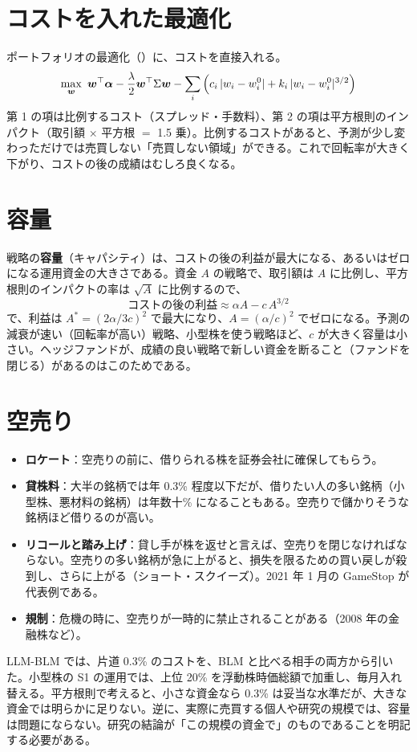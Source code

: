 \section{コストを入れた最適化}

ポートフォリオの最適化（）に、コストを直接入れる。
\begin{equation}
\max_{\bm w}\ \bm w^{\top}\bm\alpha - \frac{\lambda}{2}\bm w^{\top}\Sigma\bm w - \sum_i \Big( c_i\,|w_i - w_i^0| + k_i\,|w_i - w_i^0|^{3/2} \Big)
\end{equation}
第 1 の項は比例するコスト（スプレッド・手数料）、第 2 の項は平方根則のインパクト（取引額 $\times$ 平方根 $=$ 1.5 乗）。比例するコストがあると、予測が少し変わっただけでは売買しない「売買しない領域」ができる。これで回転率が大きく下がり、コストの後の成績はむしろ良くなる。

\section{容量}

戦略の\textbf{容量}（キャパシティ）は、コストの後の利益が最大になる、あるいはゼロになる運用資金の大きさである。資金 $A$ の戦略で、取引額は $A$ に比例し、平方根則のインパクトの率は $\sqrt{A}$ に比例するので、
\begin{equation}
\text{コストの後の利益} \approx \alpha A - c\,A^{3/2}
\end{equation}
で、利益は $A^* = (2\alpha / 3c)^2$ で最大になり、$A = (\alpha/c)^2$ でゼロになる。予測の減衰が速い（回転率が高い）戦略、小型株を使う戦略ほど、$c$ が大きく容量は小さい。ヘッジファンドが、成績の良い戦略で新しい資金を断ること（ファンドを閉じる）があるのはこのためである。

\section{空売り}

\begin{itemize}
\item \textbf{ロケート}：空売りの前に、借りられる株を証券会社に確保してもらう。
\item \textbf{貸株料}：大半の銘柄では年 0.3\% 程度以下だが、借りたい人の多い銘柄（小型株、悪材料の銘柄）は年数十\% になることもある。空売りで儲かりそうな銘柄ほど借りるのが高い。
\item \textbf{リコールと踏み上げ}：貸し手が株を返せと言えば、空売りを閉じなければならない。空売りの多い銘柄が急に上がると、損失を限るための買い戻しが殺到し、さらに上がる（ショート・スクイーズ）。2021 年 1 月の GameStop が代表例である。
\item \textbf{規制}：危機の時に、空売りが一時的に禁止されることがある（2008 年の金融株など）。
\end{itemize}

\begin{projbox}
LLM-BLM では、片道 0.3\% のコストを、BLM と比べる相手の両方から引いた。小型株の S1 の運用では、上位 20\% を浮動株時価総額で加重し、毎月入れ替える。平方根則で考えると、小さな資金なら 0.3\% は妥当な水準だが、大きな資金では明らかに足りない。逆に、実際に売買する個人や研究の規模では、容量は問題にならない。研究の結論が「この規模の資金で」のものであることを明記する必要がある。
\end{projbox}
